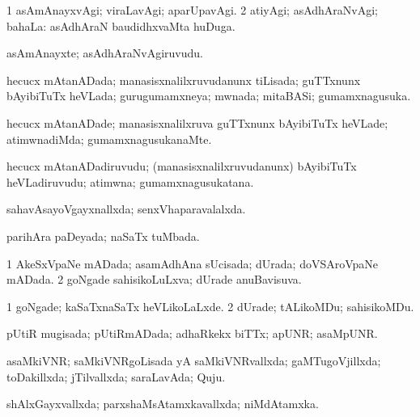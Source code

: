 {\bentry
{} 
\gl{\kirxvi}
\expl{}
\bmng
\bnum
\num{1} asAmAnayxvAgi; viraLavAgi; aparUpavAgi. 
\num{2} atiyAgi; asAdhAraNvAgi; bahaLa:  asAdhAraN baudidhxvaMta huDuga. 
\enum
\emng
\eentry

\bentry
{} 
\gl{\nA}
\expl{}
\bmng
 asAmAnayxte; asAdhAraNvAgiruvudu. 
\emng
\eentry

\bentry
{} 
\gl{\gu}
\expl{}
\bmng
 hecucx mAtanADada; manasisxnalilxruvudanunx tiLisada; guTTxnunx bAyibiTuTx heVLada; gurugumamxneya; mwnada; mitaBASi; gumamxnagusuka. 
\emng
\eentry

\bentry
{} 
\gl{\kirxvi}
\expl{}
\bmng
 hecucx mAtanADade; manasisxnalilxruva guTTxnunx bAyibiTuTx heVLade; atimwnadiMda; gumamxnagusukanaMte. 
\emng
\eentry

\bentry
{} 
\gl{\nA}
\expl{}
\bmng
hecucx mAtanADadiruvudu; (manasisxnalilxruvudanunx) bAyibiTuTx heVLadiruvudu; atimwna; gumamxnagusukatana. 
\emng
\eentry

\bentry
{} 
\gl{\gu}
\expl{}
\bmng
 sahavAsayoVgayxnallxda; senxVhaparavalalxda. 
\emng
\eentry

\bentry
{} 
\gl{\gu}
\expl{}
\bmng
 parihAra paDeyada; naSaTx tuMbada. 
\emng
\eentry

\bentry
{} 
\gl{\gu}
\expl{}
\bmng
\bnum
\num{1} AkeSxVpaNe mADada; asamAdhAna sUcisada; dUrada; doVSAroVpaNe mADada. 
\num{2} goNgade sahisikoLuLxva; dUrade anuBavisuva. 
\enum
\emng
\eentry

\bentry
{} 
\gl{\kirxvi}
\bmng
\bnum
\num{1} goNgade; kaSaTxnaSaTx heVLikoLaLxde. 
\num{2} dUrade; tALikoMDu; sahisikoMDu. 
\enum
\emng
\eentry

\bentry
{} 
\gl{\gu}
\expl{}
\bmng
 pUtiR mugisada; pUtiRmADada; adhaRkekx biTTx; apUNR; asaMpUNR. 
\emng
\eentry

\bentry
{} 
\gl{\gu}
\expl{}
\bmng
 asaMkiVNR; saMkiVNRgoLisada yA saMkiVNRvallxda; gaMTugoVjillxda; toDakillxda; jTilvallxda; saraLavAda; Quju. 
\emng
\eentry

\bentry
{} 
\gl{\gu}
\expl{}
\bmng
 shAlxGayxvallxda; parxshaMsAtamxkavallxda; niMdAtamxka. 
\emng
\eentry

}

